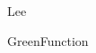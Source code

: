 \documentclass[leqno,11pt]{report}
\newcommand{\1}{\mathbbm{1}}
\theoremstyle{break}
\theoremstyle{newstyle}
\theoremstyle{newstyle}
\theoremstyle{newstyle4}
\theoremstyle{newstyle}
\theoremstyle{newstyle4}
\theoremstyle{newstyle}
\theoremstyle{newstyle}
\theoremstyle{newstyle2}
\theoremstyle{newstyle3}
\theoremstyle{newstyle2}
\theoremstyle{newstyle2}
\theoremstyle{newstyle2}
\theoremstyle{newstyle}
\theoremstyle{newstyle}
\theoremstyle{newstyle4}
\theoremstyle{newstyle2}
\theoremstyle{newstyle3}
\theoremstyle{newstyle2}
\theoremstyle{newstyle2}
\theoremstyle{newstyle2.5}
\theoremstyle{newstyle2}
\theoremstyle{newstyle2}
\theoremstyle{newstyle2}
\theoremstyle{newstyle2}
\theoremstyle{named}
\theoremstyle{named2}
\theoremstyle{named3}
\begin{document}
\begin{onehalfspacing}

  {Lee}





  
  
  

  







  
  


 {GreenFunction}


  








\end{onehalfspacing}
\end{document}
